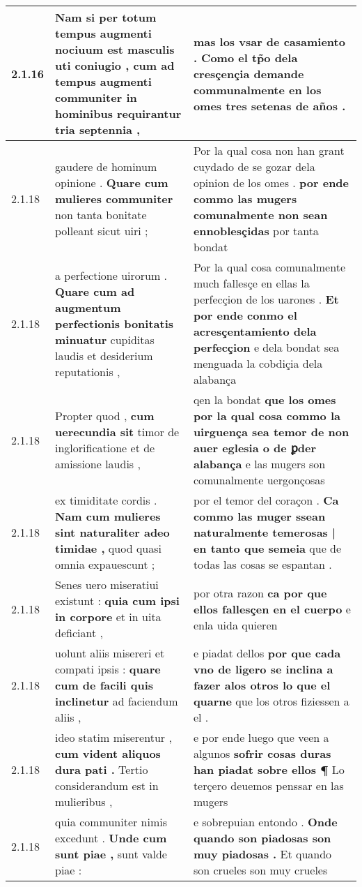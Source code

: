 \begin{tabular}{|p{1cm}|p{6.5cm}|p{6.5cm}|}
2.1.16 & Nam si per totum tempus augmenti nociuum est masculis uti coniugio , \textbf{ cum ad tempus augmenti communiter } in hominibus requirantur tria septennia , & mas los vsar de casamiento . \textbf{ Como el tp̃o dela cresçençia demande communalmente } en los omes tres setenas de años . \\\hline
2.1.18 & gaudere de hominum opinione . \textbf{ Quare cum mulieres communiter } non tanta bonitate polleant sicut uiri ; & Por la qual cosa non han grant cuydado de se gozar dela opinion de los omes . \textbf{ por ende commo las mugers comunalmente non sean ennoblesçidas } por tanta bondat \\\hline
2.1.18 & a perfectione uirorum . \textbf{ Quare cum ad augmentum perfectionis bonitatis minuatur } cupiditas laudis et desiderium reputationis , & Por la qual cosa comunalmente much fallesçe en ellas la perfecçion de los uarones . \textbf{ Et por ende conmo el acresçentamiento dela perfecçion } e dela bondat sea menguada la cobdiçia dela alabança \\\hline
2.1.18 & Propter quod , \textbf{ cum uerecundia sit } timor de inglorificatione et de amissione laudis , & qen la bondat \textbf{ que los omes por la qual cosa commo la uirguença sea temor de non auer eglesia o de ꝑder alabança } e las mugers son comunalmente uergonçosas \\\hline
2.1.18 & ex timiditate cordis . \textbf{ Nam cum mulieres sint naturaliter adeo timidae , } quod quasi omnia expauescunt ; & por el temor del coraçon . \textbf{ Ca commo las muger ssean naturalmente temerosas | en tanto que semeia } que de todas las cosas se espantan . \\\hline
2.1.18 & Senes uero miseratiui existunt : \textbf{ quia cum ipsi in corpore } et in uita deficiant , & por otra razon \textbf{ ca por que ellos fallesçen en el cuerpo } e enla uida quieren \\\hline
2.1.18 & uolunt aliis misereri et compati ipsis : \textbf{ quare cum de facili quis inclinetur } ad faciendum aliis , & e piadat dellos \textbf{ por que cada vno de ligero se inclina a fazer alos otros lo que el quarne } que los otros fiziessen a el . \\\hline
2.1.18 & ideo statim miserentur , \textbf{ cum vident aliquos dura pati . } Tertio considerandum est in mulieribus , & e por ende luego que veen a algunos \textbf{ sofrir cosas duras han piadat sobre ellos ¶ } Lo terçero deuemos penssar en las mugers \\\hline
2.1.18 & quia communiter nimis excedunt . \textbf{ Unde cum sunt piae , } sunt valde piae : & e sobrepuian entondo . \textbf{ Onde quando son piadosas son muy piadosas . } Et quando son crueles son muy crueles \\\hline

\end{tabular}
